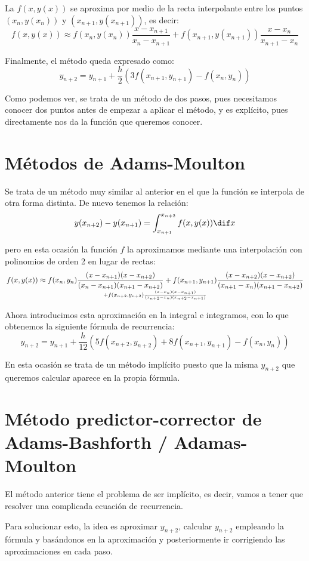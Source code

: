 La $f(x,y(x))$ se aproxima por medio de la recta interpolante entre los puntos $(x_n,y(x_n))$ y $(x_{n+1},y(x_{n+1}))$, es decir:
\[f(x,y(x)) \approx f(x_n, y(x_n)) \frac{x-x_{n+1}}{x_n-x_{n+1}}+f(x_{n+1},y(x_{n+1}))\frac{x-x_n}{x_{n+1}-x_n}\]

Finalmente, el método queda expresado como:
\[y_{n+2} = y_{n+1}+\frac{h}{2}\left( 3f(x_{n+1},y_{n+1})-f(x_n,y_n)\right)\]

Como podemos ver, se trata de un método de dos pasos, pues necesitamos conocer dos puntos antes de empezar a aplicar el método, y es explícito, pues directamente nos da la función que queremos conocer.

\section{Métodos de Adams-Moulton}
Se trata de un método muy similar al anterior en el que la función se interpola de otra forma distinta. De nuevo tenemos la relación:
\[y(x_{n+2}) - y(x_{n+1}) = \int_{x_{n+1}}^{x_{n+2}} f(x,y(x)) \dif x\]

pero en esta ocasión la función $f$ la aproximamos mediante una interpolación con polinomios de orden 2 en lugar de rectas:
\[f(x,y(x)) \approx f(x_n,y_n) \frac{(x-x_{n+1})(x-x_{n+2})}{(x_n-x_{n+1})(x_{n+1}-x_{n+2})} + f(x_{n+1},y_{n+1})\frac{(x-x_{n+2})(x-x_{n+2})}{(x_{n+1}-x_n)(x_{n+1}-x_{n+2})} \atop+f(x_{n+2},y_{n+2})\frac{(x-x_{n})(x-x_{n+1})}{(x_{n+2}-x_n)(x_{n+2}-x_{n+1})}\]

Ahora introducimos esta aproximación en la integral e integramos, con lo que obtenemos la siguiente fórmula de recurrencia:
\[y_{n+2} = y_{n+1} + \frac{h}{12}\left( 5f(x_{n+2},y_{n+2})+8f(x_{n+1},y_{n+1})-f(x_n,y_n)\right)\]

En esta ocasión se trata de un método implícito puesto que la misma $y_{n+2}$ que queremos calcular aparece en la propia fórmula.

\section{Método predictor-corrector de Adams-Bashforth / Adamas-Moulton}

El método anterior tiene el problema de ser implícito, es decir, vamos a tener que resolver una complicada ecuación de recurrencia.

Para solucionar esto, la idea es aproximar $y_{n+2}$, calcular $y_{n+2}$ empleando la fórmula y basándonos en la aproximación y posteriormente ir corrigiendo las aproximaciones en cada paso.

